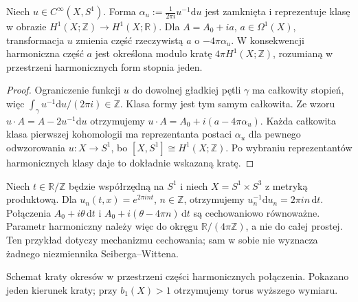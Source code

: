 \begin{stwierdzenie}
\label{prop:tg-sw12-lattice}
Niech $u\in C^\infty(X,S^1)$. Forma
$\alpha_u:=\frac{1}{2\pi i}u^{-1}\mathrm du$ jest zamknięta
i reprezentuje klasę w obrazie
$H^1(X;\mathbb Z)\to H^1(X;\mathbb R)$.
Dla $A=A_0+i a$, $a\in\Omega^1(X)$, transformacja $u$
zmienia część rzeczywistą $a$ o $-4\pi\alpha_u$.
W konsekwencji harmoniczna część $a$ jest określona
modulo kratę $4\pi H^1(X;\mathbb Z)$, rozumianą
w przestrzeni harmonicznych form stopnia jeden.
\end{stwierdzenie}

\begin{proof}
Ograniczenie funkcji $u$ do dowolnej gładkiej pętli
$\gamma$ ma całkowity stopień, więc
$\int_\gamma u^{-1}\mathrm du/(2\pi i)\in\mathbb Z$.
Klasa formy jest tym samym całkowita. Ze wzoru
$u\cdot A=A-2u^{-1}\mathrm du$ otrzymujemy
$u\cdot A=A_0+i(a-4\pi\alpha_u)$.
Każda całkowita klasa pierwszej kohomologii ma reprezentanta
postaci $\alpha_u$ dla pewnego odwzorowania $u:X\to S^1$,
bo $[X,S^1]\cong H^1(X;\mathbb Z)$. Po wybraniu
reprezentantów harmonicznych klasy daje to dokładnie
wskazaną kratę.
\end{proof}

\begin{przyklad}
Niech $t\in\mathbb R/\mathbb Z$ będzie współrzędną na
$S^1$ i niech $X=S^1\times S^3$ z metryką produktową.
Dla $u_n(t,x)=e^{2\pi int}$, $n\in\mathbb Z$,
otrzymujemy $u_n^{-1}\mathrm du_n=2\pi in\,\mathrm dt$.
Połączenia $A_0+i\theta\,\mathrm dt$ i
$A_0+i(\theta-4\pi n)\,\mathrm dt$ są cechowaniowo
równoważne. Parametr harmoniczny należy więc do okręgu
$\mathbb R/(4\pi\mathbb Z)$, a nie do całej prostej.
Ten przykład dotyczy mechanizmu cechowania; sam w sobie
nie wyznacza żadnego niezmiennika Seiberga--Wittena.
\end{przyklad}

\begin{center}

{\footnotesize Schemat kraty okresów w przestrzeni części harmonicznych
połączenia. Pokazano jeden kierunek kraty; przy $b_1(X)>1$
otrzymujemy torus wyższego wymiaru.}
\end{center}

